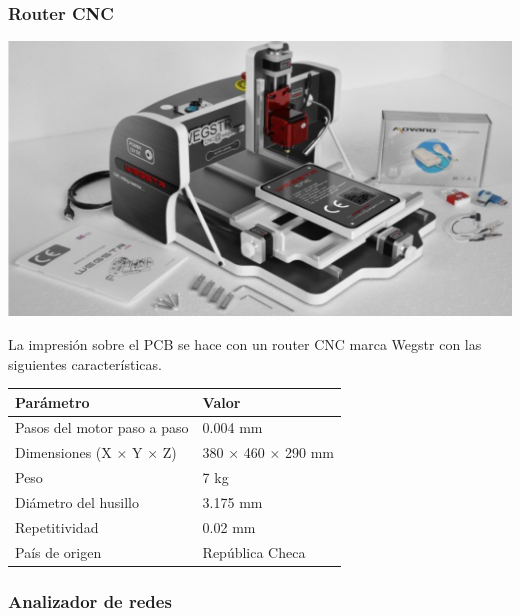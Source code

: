 \documentclass[a4paper, 12pt]{article}
\begin{document}
\subsubsection*{Router CNC}
\begin{minipage}{0.32\linewidth}
    \includegraphics[width=1\linewidth]{./img/wegstr.png}
\end{minipage}
\begin{minipage}{0.66\linewidth}
La impresión sobre el PCB se hace con un router CNC marca Wegstr \cite{wegstr} con las siguientes características.
\end{minipage}
\vspace{8pt}

\begin{center}
\begin{tabular}{|l|l|}
\hline
\textbf{Parámetro} & \textbf{Valor} \\
\hline
Pasos del motor paso a paso & 0.004 mm \\
Dimensiones (X × Y × Z) & 380 × 460 × 290 mm \\
Peso & 7 kg \\
Diámetro del husillo & 3.175 mm \\
Repetitividad & 0.02 mm \\
País de origen & República Checa \\
\hline
\end{tabular}
\end{center}

\subsubsection*{Analizador de redes}
\end{document}
